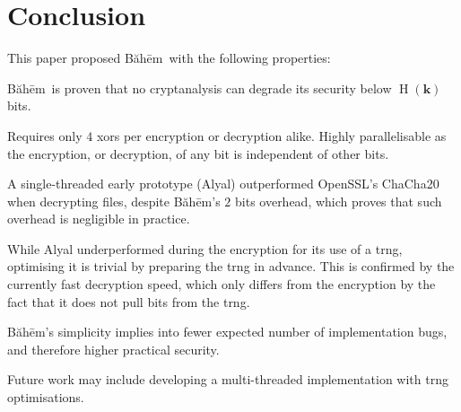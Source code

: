 \documentclass[twocolumn]{article}
\newcommand{\baheem}{Băhēm}
\DeclareMathOperator{\entropy}{H}
\begin{document}
\section{Conclusion}
This paper proposed \baheem\ with the following properties:
\begin{description}[itemsep=0em]
    \item[Secure.] \baheem\ is proven that no cryptanalysis can degrade its
        security below $\entropy(\mathbf{k})$ bits.
    \item[Fast.] Requires only $4$ \glspl{xor} per encryption or decryption
        alike.  Highly parallelisable as the encryption, or decryption, of
        any bit is independent of other bits.

        A single-threaded early prototype (Alyal) outperformed OpenSSL's
        ChaCha20 when decrypting files, despite \baheem's $2$ bits
        overhead, which proves that such overhead is negligible in
        practice.

        While Alyal underperformed during the encryption for its use of a
        \gls{trng}, optimising it is trivial by preparing the \gls{trng} in
        advance.  This is confirmed by the currently fast decryption speed,
        which only differs from the encryption by the fact that it does not
        pull bits from the \gls{trng}.
    \item[Simple.] \baheem's simplicity implies into fewer expected number
        of implementation bugs, and therefore higher practical security.
\end{description}

Future work may include developing a multi-threaded implementation with
\gls{trng} optimisations.



\end{document}
